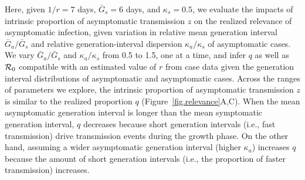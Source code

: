 Here, given $1/r=7$ days, $\bar G_s=6$ days, and $\kappa_s=0.5$, we evaluate the impacts of intrinsic proportion of asymptomatic transmission $z$ on the realized relevance of asymptomatic infection, given variation in relative mean generation interval $\bar G_a/\bar G_s$ and relative generation-interval dispersion $\kappa_a/\kappa_s$ of asymptomatic cases.
We vary $\bar G_a/\bar G_s$ and $\kappa_a/\kappa_s$ from 0.5 to 1.5, one at a time, and infer $q$ as well as ${\cal{R}}_0$ compatible with an estimated value of $r$ from case data given the generation interval distributions of asymptomatic and asymptomatic cases.
Across the ranges of parameters we explore, the intrinsic proportion of asymptomatic transmission $z$ is similar to the realized proportion $q$ (Figure~\ref{fig.relevance}A,C).
When the mean asymptomatic generation interval is longer than the mean symptomatic generation interval, $q$ decreases because short generation intervals (i.e., fast transmission) drive transmission events during the growth phase.
On the other hand, assuming a wider asymptomatic generation interval (higher $\kappa_a$) increases $q$ because the amount of short generation intervals (i.e., the proportion of faster transmission) increases.


